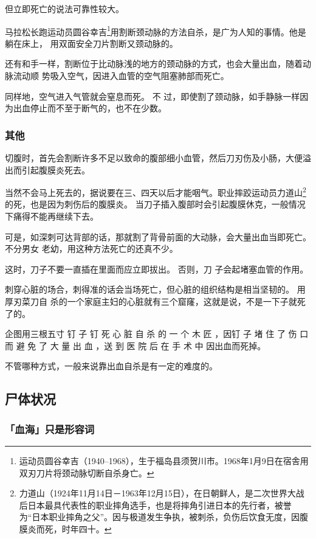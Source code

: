 \documentclass[UTF8]{ctexart}
\begin{document}
但立即死亡的说法可靠性较大。

马拉松长跑运动员圆谷幸吉\footnote{运动员圆谷幸吉（1940–1968），生于福岛县须贺川市。1968年1月9日在宿舎用双刃刀片将颈动脉切断自杀身亡。}用割断颈动脉的方法自杀，是广为人知的事情。他是躺在床上， 用双面安全刀片割断又颈动脉的。

还有和手一样，割断位于比动脉浅的地方的颈动脉的方式，也会大量出血，随着动脉流动顺 势吸入空气，因进入血管的空气阻塞肺部而死亡。

同样地，空气进入气管就会窒息而死。
不 过，即使割了颈动脉，如手静脉一样因为出血停止而不至于断气的，也不在少数。

\subsubsection{其他}

切腹时，首先会割断许多不足以致命的腹部细小血管，然后刀刃伤及小肠，大便溢出而引起腹膜炎死去。

当然不会马上死去的，据说要在三、四天以后才能咽气。职业摔跤运动员力道山\footnote{力道山（1924年11月14日－1963年12月15日），在日朝鲜人，是二次世界大战后日本最具代表性的职业摔角选手，也是将摔角引进日本的先行者，被誉为“日本职业摔角之父”。因与极道发生争执，被刺杀，负伤后饮食无度，因腹膜炎而死，时年四十。}的死，也是因为刺伤后的腹膜炎。
当刀子插入腹部时会引起腹膜休克，一般情况下痛得不能再继续下去。

可是，如深刺可达背部的话，那就割了背骨前面的大动脉，会大量出血当即死亡。
不分男女 老幼，用这种方法死亡的还真不少。

这时，刀子不要一直插在里面而应立即拔出。
否则，刀 子会起堵塞血管的作用。 

刺穿心脏的场合，刺得准的话会当场死亡，但心脏的组织结构是相当坚韧的。
用厚刃菜刀自 杀的一个家庭主妇的心脏就有三个窟窿，这就是说，不是一下子就死了的。

企图用三根五寸 钉 子 钉 死 心 脏 自 杀 的 一 个 木 匠 ，因钉 子 堵 住 了 伤 口 而 避 免 了 大 量 出 血 ，送 到 医 院 后 在 手 术 中 因出血而死掉。

不管哪种方式，一般来说靠出血自杀是有一定的难度的。

\subsection{尸体状况}

\subsubsection*{「血海」只是形容词}
\end{document}
